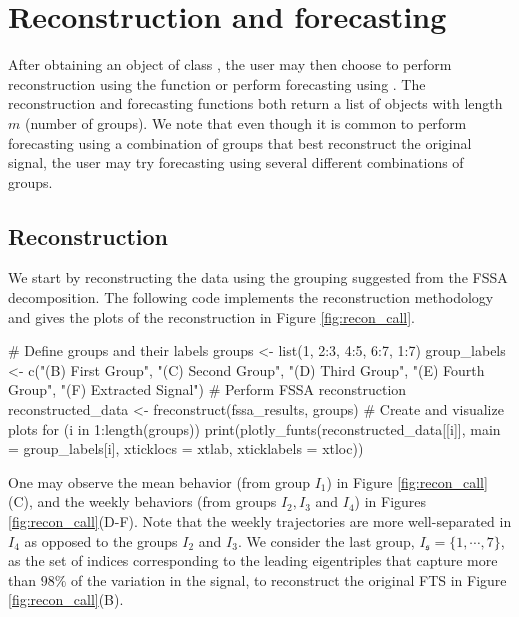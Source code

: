 \section{Reconstruction and forecasting}
After obtaining an object of class , the user may then choose to perform reconstruction using the  function or perform forecasting using . The reconstruction and forecasting functions both return a list of  objects with length $m$ (number of groups). We note that even though it is common to perform forecasting using a combination of groups that best reconstruct the original signal, the user may try forecasting using several different combinations of groups.
\subsection{Reconstruction}
We start by reconstructing the  data using the grouping suggested 
from the FSSA decomposition. The following code implements the reconstruction 
methodology and gives the plots of the reconstruction in Figure 
\ref{fig:recon_call}. 
\begin{example}
# Define groups and their labels
groups <- list(1, 2:3, 4:5, 6:7, 1:7)
group_labels <- c("(B) First Group",
	"(C) Second Group",
	"(D) Third Group",
	"(E) Fourth Group",
	"(F) Extracted Signal")
# Perform FSSA reconstruction
reconstructed_data  <- freconstruct(fssa_results, groups)
# Create and visualize plots
for (i in 1:length(groups)) {
  print(plotly_funts(reconstructed_data[[i]], main = group_labels[i], 
  		xticklocs = xtlab, xticklabels = xtloc))
}
\end{example}
One may observe the mean behavior (from group $I_1$) in Figure \ref{fig:recon_call}(C), and the weekly behaviors (from groups $I_2, I_3$ and $I_4$) in Figures \ref{fig:recon_call}(D-F). Note that the weekly trajectories are more well-separated in $I_4$ as opposed to the groups $I_2$ and $I_3$. We consider the last group, $I_{\mathfrak{s}}=\{1,\cdots,7\}$, as the set of indices corresponding to the leading eigentriples that capture more than $98\%$ of the variation in the signal, to reconstruct the original FTS in Figure \ref{fig:recon_call}(B).
